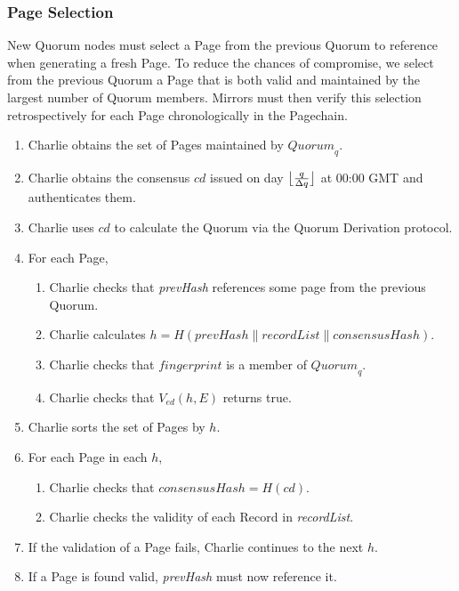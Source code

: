 \documentclass{sig-alternate}
\DeclarePairedDelimiter{\floor}{\lfloor}{\rfloor}
\newcommand*\concat{\mathbin{\|}}
\begin{document}
\subsubsection{Page Selection} %

New Quorum nodes must select a Page from the previous Quorum to reference when generating a fresh Page. To reduce the chances of compromise, we select from the previous Quorum a Page that is both valid and maintained by the largest number of Quorum members. Mirrors must then verify this selection retrospectively for each Page chronologically in the Pagechain.

\begin{enumerate}
	\item Charlie obtains the set of Pages maintained by $ \mathit{Quorum}_{q} $.
	\item Charlie obtains the consensus $ \mathit{cd} $ issued on day $ \floor[\big]{\frac{q}{\Delta q}} $ at 00:00 GMT and authenticates them.
	\item Charlie uses $ \mathit{cd} $ to calculate the Quorum via the Quorum Derivation protocol.
	\item For each Page,
		\begin{enumerate}
			\item Charlie checks that \emph{prevHash} references some page from the previous Quorum.
			\item Charlie calculates $ h = H(\mathit{prevHash} \concat \mathit{recordList} \concat \mathit{consensusHash}) $.
			\item Charlie checks that $ \mathit{fingerprint} $ is a member of $ \mathit{Quorum}_{q} $.
			\item Charlie checks that $ V_{\mathit{ed}}(h, E) $ returns true.
		\end{enumerate}
	\item Charlie sorts the set of Pages by $ h $.
	\item For each Page in each $ h $,
		\begin{enumerate}
			\item Charlie checks that $ \mathit{consensusHash} = H(\mathit{cd}) $.
			\item Charlie checks the validity of each Record in \emph{recordList}.
		\end{enumerate}
	\item If the validation of a Page fails, Charlie continues to the next $ h $.
	\item If a Page is found valid, \emph{prevHash} must now reference it.
\end{enumerate}
\end{document}
